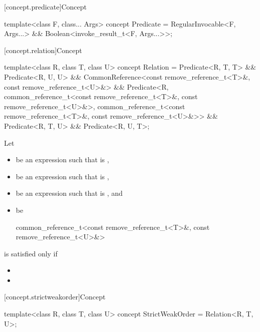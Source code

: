 [concept.predicate]{Concept }

%
\begin{itemdecl}
template<class F, class... Args>
concept Predicate = RegularInvocable<F, Args...> &&
  Boolean<invoke_result_t<F, Args...>>;
\end{itemdecl}

[concept.relation]{Concept }

%
\begin{itemdecl}
template<class R, class T, class U>
concept Relation = Predicate<R, T, T> && Predicate<R, U, U> &&
  CommonReference<const remove_reference_t<T>&, const remove_reference_t<U>&> &&
  Predicate<R,
    common_reference_t<const remove_reference_t<T>&, const remove_reference_t<U>&>,
    common_reference_t<const remove_reference_t<T>&, const remove_reference_t<U>&>> &&
  Predicate<R, T, U> && Predicate<R, U, T>;
\end{itemdecl}

\begin{itemdescr}
\pnum
Let
\begin{itemize}
\item {} be an expression such that  is ,
\item {} be an expression such that  is ,
\item {} be an expression such that  is ,
  and
\item {} be
  \begin{codeblock}
  common_reference_t<const remove_reference_t<T>&,
  const remove_reference_t<U>&>
  \end{codeblock}
\end{itemize}
 is satisfied only if

\begin{itemize}
\item {}
\item {}
\end{itemize}
\end{itemdescr}

[concept.strictweakorder]{Concept }

%
\begin{itemdecl}
template<class R, class T, class U>
concept StrictWeakOrder = Relation<R, T, U>;
\end{itemdecl}

